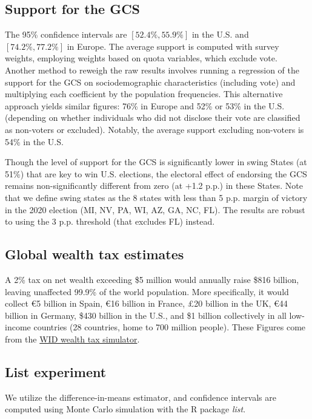 \documentclass{nature}
\begin{document}
\begin{methods}
\subsection{Support for the GCS} The 95\% confidence intervals are $[52.4\%, 55.9\%]$ in the U.S. and $[74.2\%, 77.2\%]$ in Europe. The average support is computed with survey weights, employing weights based on quota variables, which exclude vote. Another method to reweigh the raw results involves running a regression of the support for the GCS on sociodemographic characteristics (including vote) and multiplying each coefficient by the population frequencies. This alternative approach yields similar figures: 76\% in Europe and 52\% or 53\% in the U.S. (depending on whether individuals who did not disclose their vote are classified as non-voters or excluded). Notably, the average support excluding non-voters is 54\% in the U.S. 

Though the level of support for the GCS is significantly lower in swing States (at 51\%) that are key to win U.S. elections, the electoral effect of endorsing the GCS remains non-significantly different from zero (at +1.2 p.p.) in these States. Note that we define swing states as the 8 states with less than 5 p.p. margin of victory in the 2020 election (MI, NV, PA, WI, AZ, GA, NC, FL). The results are robust to using the 3 p.p. threshold (that excludes FL) instead. 

\subsection{Global wealth tax estimates}
A 2\% tax on net wealth exceeding \$5 million would annually raise \$816 billion, leaving unaffected 99.9\% of the world population. More specifically, it would collect \euro{}5 billion in Spain, \euro{}16 billion in France, £20 billion in the UK, \euro{}44 billion in Germany, \$430 billion in the U.S., and \$1 billion collectively in all low-income countries (28 countries, home to 700 million people). These Figures come from the \href{https://wid.world/world-wealth-tax-simulator/}{WID wealth tax simulator}.\cite{chancel_world_2022}

\subsection{List experiment}
We utilize the difference-in-means estimator, and confidence intervals are computed using Monte Carlo simulation with the R package \textit{list}.\cite{imai_multivariate_2011}


\end{methods}
\end{document}

